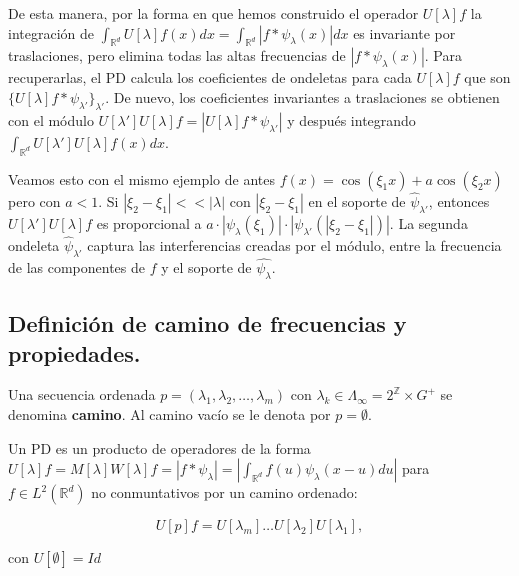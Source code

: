 \noindent De esta manera, por la forma en que hemos construido el operador $U[\lambda] f$ la integración de $\int_{\mathbb{R}^d}U[\lambda]f(x) dx= \int_{\mathbb{R}^d} | f \ast \psi_\lambda(x)|dx$ es invariante por traslaciones, pero elimina todas las altas frecuencias de $|f \ast \psi_\lambda(x)|$. Para recuperarlas, el PD calcula los coeficientes de ondeletas para cada $U[\lambda]f$ que son $\lbrace U[\lambda]f \ast \psi_{\lambda'}\rbrace_{\lambda'}$. De nuevo, los coeficientes invariantes a traslaciones se obtienen con el módulo $U[\lambda']U[\lambda]f=|U[\lambda]f \ast \psi_{\lambda'}|$ y después integrando $\int_{\mathbb{R}^d} U[\lambda']U[\lambda]f(x) dx$. 

\medskip

\noindent Veamos esto con el mismo ejemplo de antes $f(x)=\cos(\xi_1 x)+a\cos(\xi_2 x)$ pero con $a<1$. Si $|\xi_2-\xi_1| << |\lambda|$ con $|\xi_2 - \xi_1|$ en el soporte de $\widehat{\psi}_{\lambda'}$, entonces $U[\lambda']U[\lambda]f$ es proporcional a $a\cdot |\psi_\lambda(\xi_1)|\cdot |\psi_{\lambda'}(|\xi_2-\xi_1|)|$. La segunda ondeleta $\widehat{\psi}_{\lambda'}$ captura las interferencias creadas por el módulo, entre la frecuencia de las componentes de $f$ y el soporte de $\widehat{\psi_\lambda}$.

\medskip

\subsection{Definición de camino de frecuencias y propiedades.}

\begin{definicion}
Una secuencia ordenada $p=(\lambda_1,\lambda_2, \ldots , \lambda_m)$ con $\lambda_k \in \Lambda_\infty=2^{\mathbb{Z}} \times G^{+} $ se denomina \textbf{camino}. Al camino vacío se le denota por $p=\emptyset$. 
\end{definicion}


\begin{definicion}
Un PD es un producto de operadores de la forma $U[\lambda]f=M[\lambda]W[\lambda]f=|f \ast \psi_\lambda|=\left | \int_{\mathbb{R}^d} f(u)\psi_\lambda(x-u) du \right|$ para $f \in L^2(\mathbb{R}^d)$ no conmuntativos por un camino ordenado:

\begin{equation}
  U[p]f=U[\lambda_m] \ldots U[\lambda_2]U[\lambda_1],
\end{equation}

con $U[\emptyset]=Id$
\end{definicion}

